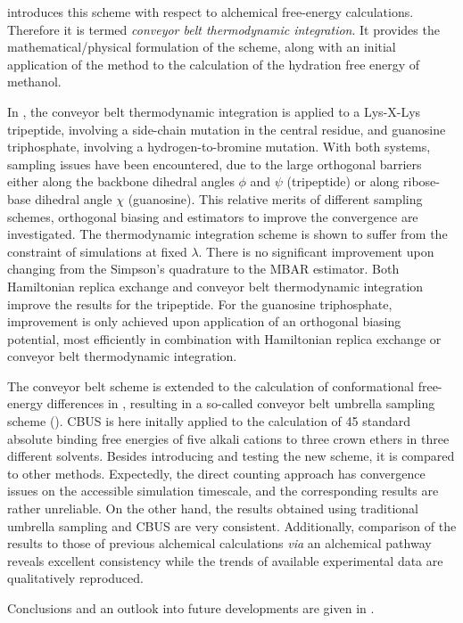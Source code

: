  introduces this scheme with respect to
alchemical free-energy calculations. Therefore it is termed \textit{conveyor belt thermodynamic integration}.
It provides the mathematical/physical formulation of the scheme, along with an initial 
application of the method to the calculation of the hydration free energy of methanol.

In , the conveyor belt thermodynamic integration is applied to 
a Lys-X-Lys tripeptide, involving a side-chain mutation in the central residue,
and guanosine triphosphate, involving a hydrogen-to-bromine mutation.
With both systems, sampling issues have been encountered, due to 
the large orthogonal barriers either along the backbone 
dihedral angles $\phi$ and $\psi$ (tripeptide) or along 
ribose-base dihedral angle $\chi$ (guanosine). 
This relative merits of different sampling schemes, orthogonal biasing and estimators to improve the convergence 
are investigated.
%
%
The thermodynamic integration scheme is shown to suffer from the 
constraint of simulations at fixed $\lambda$.
%
There is no significant improvement upon changing 
from the Simpson's quadrature to the MBAR estimator.
%
Both Hamiltonian replica exchange and conveyor belt 
thermodynamic integration improve the results for
the tripeptide.
%
For the guanosine triphosphate, improvement
is only achieved upon application of an orthogonal biasing potential, 
most efficiently in combination with Hamiltonian replica exchange or
conveyor belt thermodynamic integration.
%

The conveyor belt scheme is extended to the calculation of
conformational free-energy differences in ,
resulting in a so-called conveyor belt umbrella sampling scheme (\CBUS).
%
CBUS is here initally applied to the calculation of 45 standard absolute binding free energies 
of five alkali cations to three crown ethers in three different solvents.
%
Besides introducing and testing the new scheme, it is compared to 
other methods.
%
Expectedly, the direct counting approach has convergence issues
on the accessible simulation timescale, and the corresponding results
are rather unreliable. On the other hand, the results obtained 
using traditional umbrella sampling and CBUS are
very consistent. 
%
Additionally, comparison of the results to
those of previous alchemical calculations {\em via} an
alchemical pathway reveals excellent 
consistency while the trends of available experimental data
are qualitatively reproduced.

Conclusions and an outlook into future developments
are given in .
